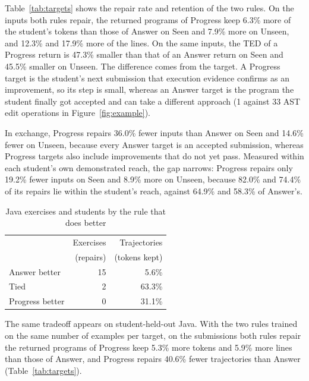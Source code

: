 \documentclass[10pt,conference]{IEEEtran}
\begin{document}
Table~\ref{tab:targets} shows the repair rate and retention of the two rules. On the inputs both rules repair, the returned programs of Progress keep 6.3\% more of the student's tokens than those of Answer on Seen and 7.9\% more on Unseen, and 12.3\% and 17.9\% more of the lines. On the same inputs, the TED of a Progress return is 47.3\% smaller than that of an Answer return on Seen and 45.5\% smaller on Unseen. The difference comes from the target. A Progress target is the student's next submission that execution evidence confirms as an improvement, so its step is small, whereas an Answer target is the program the student finally got accepted and can take a different approach (1 against 33 AST edit operations in Figure~\ref{fig:example}).

In exchange, Progress repairs 36.0\% fewer inputs than Answer on Seen and 14.6\% fewer on Unseen, because every Answer target is an accepted submission, whereas Progress targets also include improvements that do not yet pass. Measured within each student's own demonstrated reach, the gap narrows: Progress repairs only 19.2\% fewer inputs on Seen and 8.9\% more on Unseen, because 82.0\% and 74.4\% of its repairs lie within the student's reach, against 64.9\% and 58.3\% of Answer's.



\begin{table}[h]
\caption{Java exercises and students by the rule that does better}
\label{tab:uneven}
\centering\footnotesize
\begin{tabular}{l||rr}
\toprule
 & Exercises & Trajectories \\
 & (repairs) & (tokens kept) \\
\midrule
Answer better & 15 & 5.6\% \\
Tied & 2 & 63.3\% \\
Progress better & 0 & 31.1\% \\
\bottomrule
\end{tabular}
\end{table}

The same tradeoff appears on student-held-out Java. With the two rules trained on the same number of examples per target, on the submissions both rules repair the returned programs of Progress keep 5.3\% more tokens and 5.9\% more lines than those of Answer, and Progress repairs 40.6\% fewer trajectories than Answer (Table~\ref{tab:targets}).
\end{document}
